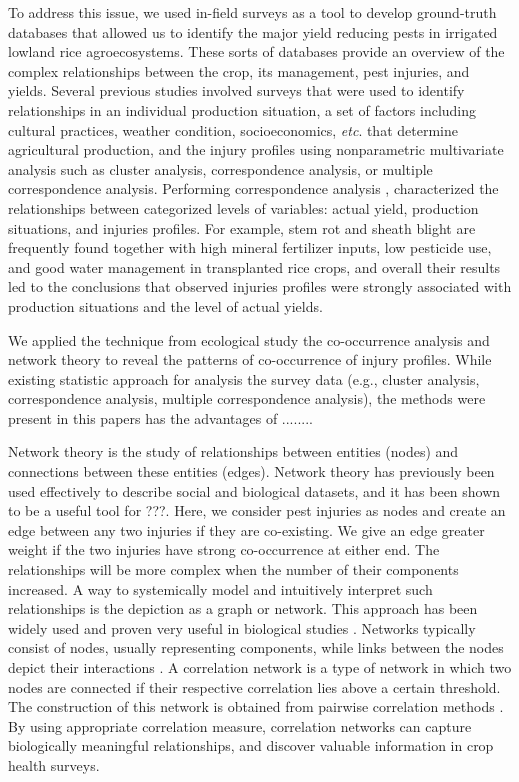 \documentclass{frontiersSCNS} %
\begin{document}
To address this issue, we used in-field surveys as a tool to develop ground-truth databases that allowed us to identify the major yield reducing pests in irrigated lowland rice agroecosystems. These sorts of databases provide an overview of the complex relationships between the crop, its management, pest injuries, and yields. Several previous studies \citet{Savary_2000_Quantification,Savary_2000_Characterization, Dong_2010_Characterization, Reddy_2011_Characterizing} involved surveys that were used to identify relationships in an individual production situation, a set of factors including cultural practices, weather condition, socioeconomics, \textit{etc}. that determine agricultural production, and the injury profiles using nonparametric multivariate analysis such as cluster analysis, correspondence analysis, or multiple correspondence analysis. Performing correspondence analysis \citep{Savary_1995}, characterized the relationships between categorized levels of variables: actual yield, production situations, and injuries profiles. For example, stem rot and sheath blight are frequently found together with high mineral fertilizer inputs, low pesticide use, and good water management in transplanted rice crops, and overall their results led to the conclusions that observed injuries profiles were strongly associated with production situations and the level of actual yields. 

We applied the technique from ecological study the co-occurrence analysis and network theory to reveal the patterns of co-occurrence of injury profiles. While existing statistic approach for analysis the survey data (e.g., cluster analysis, correspondence analysis, multiple correspondence analysis), the methods were present in this papers has the advantages of ........

Network theory is the study of relationships between entities (nodes) and connections between these entities (edges). Network theory has previously been used effectively to describe social and biological datasets, and it has been shown to be a useful tool for ???. Here, we consider pest injuries as nodes and create an edge between any two injuries if they are co-existing. We give an edge greater weight if the two injuries have strong co-occurrence at either end.  The relationships will be more complex when the number of their components increased. A way to systemically model and intuitively interpret such relationships is the depiction as a graph or network. This approach has been widely used and proven very useful in biological studies \citep{Moslonka_Lefebvre_2011}. Networks typically consist of nodes, usually representing components, while links between the nodes depict their interactions \citep{Proulx_2005}. A correlation network is a type of network in which two nodes are connected if their respective correlation lies above a certain threshold. The construction of this network is obtained from pairwise correlation methods \citep{Toubiana_2013}. By using appropriate correlation measure, correlation networks can capture biologically meaningful relationships, and discover valuable information in crop health surveys.
\end{document}
